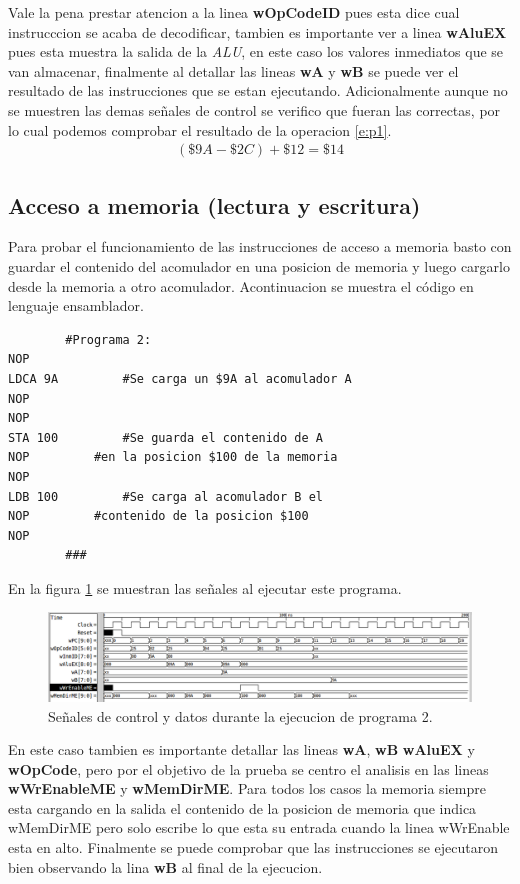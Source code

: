 \documentclass[paper=letter, fontsize=12pt]{article}
\begin{document}
Vale la pena prestar atencion a la linea \textbf{wOpCodeID} pues esta dice cual instrucccion se acaba de decodificar, tambien es importante ver a linea \textbf{wAluEX} pues esta muestra la salida de la \textit{ALU}, en este caso los valores inmediatos que se van almacenar, finalmente al detallar las lineas \textbf{wA} y \textbf{wB} se puede ver el resultado de las instrucciones que se estan ejecutando. Adicionalmente aunque no se muestren las demas señales de control se verifico que fueran las correctas, por lo cual podemos comprobar el resultado de la operacion \ref{e:p1}.\\

\begin{align} 
\label{e:p1}
(\$9A - \$2C) + \$12 = \$14
\end{align}

\subsection{Acceso a memoria (lectura y escritura)}

Para probar el funcionamiento de las instrucciones de acceso a memoria basto con guardar el contenido del acomulador en una posicion de memoria y luego cargarlo desde la memoria a otro acomulador. Acontinuacion se muestra el código en lenguaje ensamblador.

\begin{lstlisting}
		#Programa 2:
NOP
LDCA 9A			#Se carga un $9A al acomulador A
NOP
NOP
STA 100			#Se guarda el contenido de A 
NOP			#en la posicion $100 de la memoria
NOP
LDB 100			#Se carga al acomulador B el 
NOP			#contenido de la posicion $100
NOP
		###
\end{lstlisting}

En la figura \ref{i:p2} se muestran las señales al ejecutar este programa.\\

\begin{figure}[hbtp]
\centering
\includegraphics[width=1\linewidth]{../media/Prog2.png}
\caption{Señales de control y datos durante la ejecucion de programa 2.}
\label{i:p2}
\end{figure}

En este caso tambien es importante detallar las lineas \textbf{wA}, \textbf{wB} \textbf{wAluEX} y \textbf{wOpCode}, pero por el objetivo de la prueba se centro el analisis en las lineas \textbf{wWrEnableME} y \textbf{wMemDirME}. Para todos los casos la memoria siempre esta cargando en la salida el contenido de la posicion de memoria que indica wMemDirME pero solo escribe lo que esta su entrada cuando la linea wWrEnable esta en alto. Finalmente se puede comprobar que las instrucciones se ejecutaron bien observando la lina \textbf{wB} al final de la ejecucion.
\end{document}
